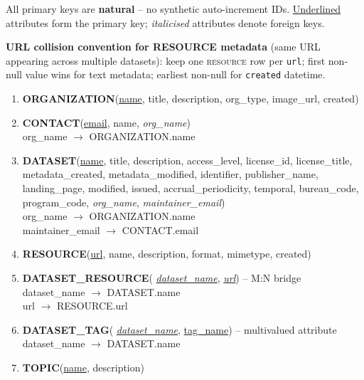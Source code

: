 \documentclass[12pt,a4paper]{article}
\begin{document}
All primary keys are \textbf{natural} -- no synthetic auto-increment IDs.
\underline{Underlined} attributes form the primary key;
\textit{italicised} attributes denote foreign keys.

\bigskip
\noindent\textbf{URL collision convention for RESOURCE metadata}
(same URL appearing across multiple datasets):
keep one \textsc{resource} row per \texttt{url};
first non-null value wins for text metadata;
earliest non-null for \texttt{created} datetime.

\begin{enumerate}
  \item \textbf{ORGANIZATION}(\underline{name}, title, description,
        org\_type, image\_url, created)

  \item \textbf{CONTACT}(\underline{email}, name, \textit{org\_name})\\
        org\_name $\rightarrow$ ORGANIZATION.name

  \item \textbf{DATASET}(\underline{name}, title, description,
        access\_level, license\_id, license\_title, metadata\_created,
        metadata\_modified, identifier, publisher\_name, landing\_page,
        modified, issued, accrual\_periodicity, temporal,
        bureau\_code, program\_code,
        \textit{org\_name}, \textit{maintainer\_email})\\
        org\_name $\rightarrow$ ORGANIZATION.name\\
        maintainer\_email $\rightarrow$ CONTACT.email

  \item \textbf{RESOURCE}(\underline{url}, name, description, format,
        mimetype, created)

  \item \textbf{DATASET\_RESOURCE}(%
        \underline{\textit{dataset\_name}},
        \underline{\textit{url}}) -- M:N bridge\\
        dataset\_name $\rightarrow$ DATASET.name\\
        url $\rightarrow$ RESOURCE.url

  \item \textbf{DATASET\_TAG}(%
        \underline{\textit{dataset\_name}},
        \underline{tag\_name}) -- multivalued attribute\\
        dataset\_name $\rightarrow$ DATASET.name

  \item \textbf{TOPIC}(\underline{name}, description)


\end{enumerate}
\end{document}
